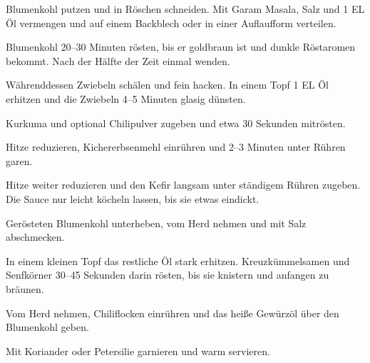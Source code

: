 \begin{recipe}
{    \step%
    Blumenkohl putzen und in Röschen schneiden. Mit Garam Masala, Salz und 1 EL Öl vermengen und auf einem Backblech oder in einer Auflaufform verteilen.
    
    \step%
    Blumenkohl 20--30 Minuten rösten, bis er goldbraun ist und dunkle Röstaromen bekommt. Nach der Hälfte der Zeit einmal wenden.
    
    \step%
    Währenddessen Zwiebeln schälen und fein hacken. In einem Topf 1 EL Öl erhitzen und die Zwiebeln 4--5 Minuten glasig dünsten.
    
    \step%
    Kurkuma und optional Chilipulver zugeben und etwa 30 Sekunden mitrösten.
    
    \step%
    Hitze reduzieren, Kichererbsenmehl einrühren und 2--3 Minuten unter Rühren garen.
    
    \step%
    Hitze weiter reduzieren und den Kefir langsam unter ständigem Rühren zugeben. Die Sauce nur leicht köcheln lassen, bis sie etwas eindickt.
    
    \step%
    Gerösteten Blumenkohl unterheben, vom Herd nehmen und mit Salz abschmecken.
    
    \step%
    In einem kleinen Topf das restliche Öl stark erhitzen. Kreuzkümmelsamen und Senfkörner 30--45 Sekunden darin rösten, bis sie knistern und anfangen zu bräunen.
    
    \step%
    Vom Herd nehmen, Chiliflocken einrühren und das heiße Gewürzöl über den Blumenkohl geben.
    
    \step%
    Mit Koriander oder Petersilie garnieren und warm servieren.
}



\end{recipe}
